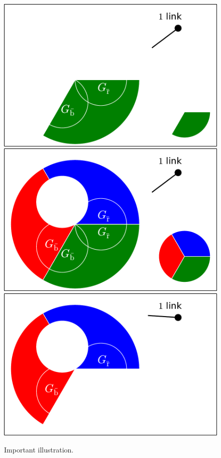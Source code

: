 \documentclass[aps, pre, onecolumn, a4paper, floatfix]{revtex4}
\begin{document}
\begin{figure}[htb]
\begin{minipage}[b]{0.3\linewidth}
\begin{center}
    \includegraphics[width=0.99\columnwidth]{sets_1_c2.pdf}\\
    \includegraphics[width=0.99\columnwidth]{sets_1_gc_no_gc_no_2.pdf}\\
    \includegraphics[width=0.99\columnwidth]{sets_1_no_2_gc_no.pdf}\\
   \end{center}
  \end{minipage}
    \caption{Important illustration.}
    \label{fig:1}
\end{figure}
\end{document}
